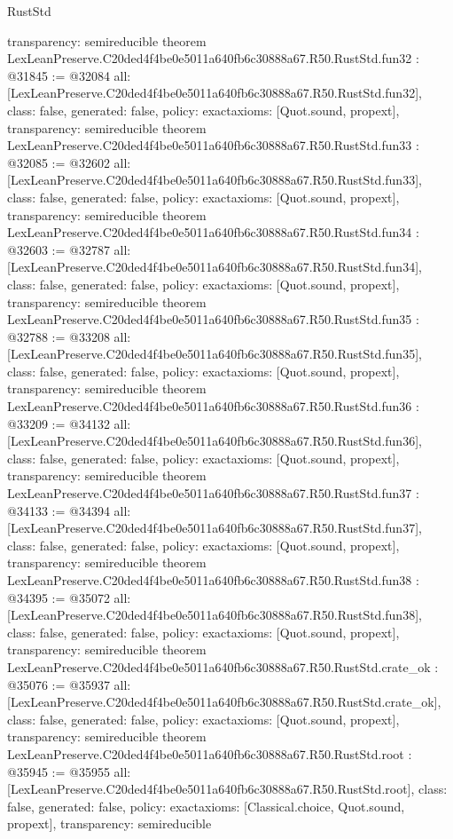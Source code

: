 \begin{lexlean}{RustStd}
\begin{coremodule}
{  transparency: semireducible
}
theorem LexLeanPreserve.C20ded4f4be0e5011a640fb6c30888a67.R50.RustStd.fun32 : @31845 := @32084 {
  all: [LexLeanPreserve.C20ded4f4be0e5011a640fb6c30888a67.R50.RustStd.fun32],
  class: false,
  generated: false,
  policy: exact{axioms: [Quot.sound, propext]},
  transparency: semireducible
}
theorem LexLeanPreserve.C20ded4f4be0e5011a640fb6c30888a67.R50.RustStd.fun33 : @32085 := @32602 {
  all: [LexLeanPreserve.C20ded4f4be0e5011a640fb6c30888a67.R50.RustStd.fun33],
  class: false,
  generated: false,
  policy: exact{axioms: [Quot.sound, propext]},
  transparency: semireducible
}
theorem LexLeanPreserve.C20ded4f4be0e5011a640fb6c30888a67.R50.RustStd.fun34 : @32603 := @32787 {
  all: [LexLeanPreserve.C20ded4f4be0e5011a640fb6c30888a67.R50.RustStd.fun34],
  class: false,
  generated: false,
  policy: exact{axioms: [Quot.sound, propext]},
  transparency: semireducible
}
theorem LexLeanPreserve.C20ded4f4be0e5011a640fb6c30888a67.R50.RustStd.fun35 : @32788 := @33208 {
  all: [LexLeanPreserve.C20ded4f4be0e5011a640fb6c30888a67.R50.RustStd.fun35],
  class: false,
  generated: false,
  policy: exact{axioms: [Quot.sound, propext]},
  transparency: semireducible
}
theorem LexLeanPreserve.C20ded4f4be0e5011a640fb6c30888a67.R50.RustStd.fun36 : @33209 := @34132 {
  all: [LexLeanPreserve.C20ded4f4be0e5011a640fb6c30888a67.R50.RustStd.fun36],
  class: false,
  generated: false,
  policy: exact{axioms: [Quot.sound, propext]},
  transparency: semireducible
}
theorem LexLeanPreserve.C20ded4f4be0e5011a640fb6c30888a67.R50.RustStd.fun37 : @34133 := @34394 {
  all: [LexLeanPreserve.C20ded4f4be0e5011a640fb6c30888a67.R50.RustStd.fun37],
  class: false,
  generated: false,
  policy: exact{axioms: [Quot.sound, propext]},
  transparency: semireducible
}
theorem LexLeanPreserve.C20ded4f4be0e5011a640fb6c30888a67.R50.RustStd.fun38 : @34395 := @35072 {
  all: [LexLeanPreserve.C20ded4f4be0e5011a640fb6c30888a67.R50.RustStd.fun38],
  class: false,
  generated: false,
  policy: exact{axioms: [Quot.sound, propext]},
  transparency: semireducible
}
theorem LexLeanPreserve.C20ded4f4be0e5011a640fb6c30888a67.R50.RustStd.crate_ok : @35076 := @35937 {
  all: [LexLeanPreserve.C20ded4f4be0e5011a640fb6c30888a67.R50.RustStd.crate_ok],
  class: false,
  generated: false,
  policy: exact{axioms: [Quot.sound, propext]},
  transparency: semireducible
}
theorem LexLeanPreserve.C20ded4f4be0e5011a640fb6c30888a67.R50.RustStd.root : @35945 := @35955 {
  all: [LexLeanPreserve.C20ded4f4be0e5011a640fb6c30888a67.R50.RustStd.root],
  class: false,
  generated: false,
  policy: exact{axioms: [Classical.choice, Quot.sound, propext]},
  transparency: semireducible
}


\end{coremodule}
\end{lexlean}
